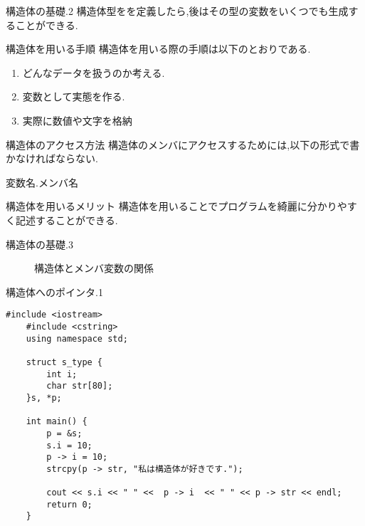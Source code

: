 \documentclass[xdvipdfmx, 8pt, t]{beamer}
\begin{document}
\begin{frame}{構造体の基礎.2}
    構造体型をを定義したら,後はその型の変数をいくつでも生成することができる.
    \begin{block}{構造体を用いる手順}
        構造体を用いる際の手順は以下のとおりである.
        \begin{enumerate}
            \item どんなデータを扱うのか考える.
            \item 変数として実態を作る.
            \item 実際に数値や文字を格納
        \end{enumerate}
    \end{block}    
    \begin{block}{構造体のアクセス方法}
        構造体のメンバにアクセスするためには,以下の形式で書かなければならない.

        変数名.メンバ名
    \end{block}
    \begin{exampleblock}{構造体を用いるメリット}
        構造体を用いることでプログラムを綺麗に分かりやすく記述することができる.
    \end{exampleblock}
\end{frame}


\begin{frame}{構造体の基礎.3}
    \begin{figure}
        \centering
        
        \caption{構造体とメンバ変数の関係}
        \label{fig:enter-label}
    \end{figure}
\end{frame}

\begin{frame}[fragile]{構造体へのポインタ.1}
\tiny
    \begin{lstlisting}[caption = 構造体ポインタの例]
    #include <iostream>
    #include <cstring>
    using namespace std;
    
    struct s_type {
        int i;
        char str[80];
    }s, *p;
    
    int main() {
        p = &s;
        s.i = 10;
        p -> i = 10;
        strcpy(p -> str, "私は構造体が好きです.");
    
        cout << s.i << " " <<  p -> i  << " " << p -> str << endl;
        return 0;
    }    
    \end{lstlisting}
\end{frame}
\end{document}
